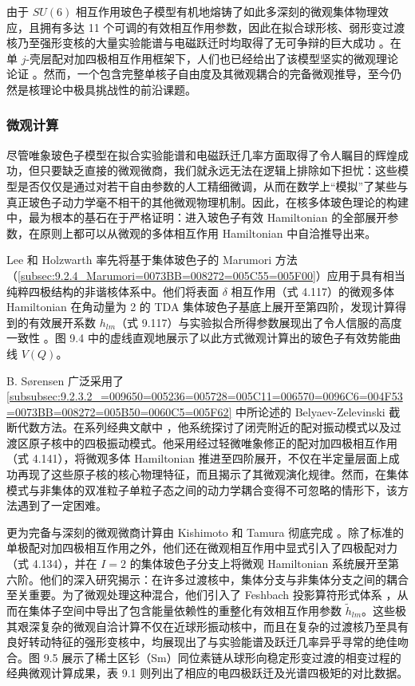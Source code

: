 由于 $SU(6)$ 相互作用玻色子模型有机地熔铸了如此多深刻的微观集体物理效应，且拥有多达 11 个可调的有效相互作用参数，因此在拟合球形核、弱形变过渡核乃至强形变核的大量实验能谱与电磁跃迁时均取得了无可争辩的巨大成功
\cite{Ia77,AOI78,Ia78}。在单 $j$-壳层配对加四极相互作用框架下，人们也已经给出了该模型坚实的微观理论论证
\cite{OAI78}。然而，一个包含完整单核子自由度及其微观耦合的完备微观推导，至今仍然是核理论中极具挑战性的前沿课题。

\subsubsection{微观计算\label{subsubsec:9.2.8.2_=005FAE=0089C2=008BA1=007B97}}

尽管唯象玻色子模型在拟合实验能谱和电磁跃迁几率方面取得了令人瞩目的辉煌成功，但只要缺乏直接的微观微商，我们就永远无法在逻辑上排除如下担忧：这些模型是否仅仅是通过对若干自由参数的人工精细微调，从而在数学上“模拟”了某些与真正玻色子动力学毫不相干的其他微观物理机制。因此，在核多体玻色理论的构建中，最为根本的基石在于严格证明：进入玻色子有效
Hamiltonian 的全部展开参数，在原则上都可以从微观的多体相互作用 Hamiltonian 中自洽推导出来。

Lee 和 Holzwarth \cite{LH75} 率先将基于集体玻色子的 Marumori 方法（\ref{subsec:9.2.4_Marumori=0073BB=008272=005C55=005F00}）应用于具有相当纯粹四极结构的非谐核体系中。他们将表面
$\delta$ 相互作用（式 4.117）的微观多体 Hamiltonian 在角动量为 2 的 TDA 集体玻色子基底上展开至第四阶，发现计算得到的有效展开系数
$h_{lm}$（式 9.117）与实验拟合所得参数展现出了令人信服的高度一致性 \cite{HL72a}。图 9.4 中的虚线直观地展示了以此方式微观计算出的玻色子有效势能曲线
$V(Q)$。

B. Sørensen 广泛采用了 \ref{subsubsec:9.2.3.2_=009650=005236=005728=005C11=006570=0096C6=004F53=0073BB=008272=005B50=0060C5=005F62}
中所论述的 Belyaev-Zelevinski 截断代数方法。在系列经典文献中 \cite{So67,So68a,So68b,So69,So70}，他系统探讨了闭壳附近的配对振动模式以及过渡区原子核中的四极振动模式。他采用经过轻微唯象修正的配对加四极相互作用（式
4.141），将微观多体 Hamiltonian 推进至四阶展开，不仅在半定量层面上成功再现了这些原子核的核心物理特征，而且揭示了其微观演化规律。然而，在集体模式与非集体的双准粒子单粒子态之间的动力学耦合变得不可忽略的情形下，该方法遇到了一定困难。

更为完备与深刻的微观微商计算由 Kishimoto 和 Tamura 彻底完成 \cite{KT72,KT76}。除了标准的单极配对加四极相互作用之外，他们还在微观相互作用中显式引入了四极配对力（式
4.134），并在 $I=2$ 的集体玻色子分支上将微观 Hamiltonian 系统展开至第六阶。他们的深入研究揭示：在许多过渡核中，集体分支与非集体分支之间的耦合至关重要。为了微观处理这种混合，他们引入了
Feshbach 投影算符形式体系 \cite{Fe58,Fe62}，从而在集体子空间中导出了包含能量依赖性的重整化有效相互作用参数
$\tilde{h}_{lm}$。这些极其艰深复杂的微观自洽计算不仅在近球形振动核中，而且在复杂的过渡核乃至具有良好转动特征的强形变核中，均展现出了与实验能谱及跃迁几率异乎寻常的绝佳吻合。图
9.5 展示了稀土区钐（Sm）同位素链从球形向稳定形变过渡的相变过程的经典微观计算成果，表 9.1 则列出了相应的电四极跃迁及光谱四极矩的对比数据。

